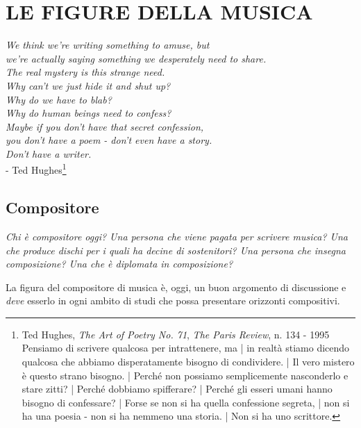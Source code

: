 
\chapter{LE FIGURE DELLA MUSICA}

\begin{flushright}
		\textit{We think we're writing something to amuse, but \\
            we're actually saying something we desperately need to share. \\
            The real mystery is this strange need. \\
            Why can't we just hide it and shut up? \\
            Why do we have to blab? \\
            Why do human beings need to confess? \\
            Maybe if you don't have that secret confession, \\
            you don't have a poem - don't even have a story. \\
            Don't have a writer.} \\
            - Ted Hughes\footnote{Ted Hughes, \emph{The Art of Poetry No. 71}, \emph{The Paris Review}, n. 134 - 1995\\
						Pensiamo di scrivere qualcosa per intrattenere, ma | in realtà stiamo
						dicendo qualcosa che abbiamo disperatamente bisogno di condividere. |
						Il vero mistero è questo strano bisogno. | Perché non possiamo
						semplicemente nasconderlo e stare zitti? | Perché dobbiamo spifferare? |
						Perché gli esseri umani hanno bisogno di confessare? | Forse se non
						si ha quella confessione segreta, |	non si ha una poesia - non si
						ha nemmeno una storia. | Non si ha uno scrittore.}
\end{flushright}

\section{Compositore}

\emph{Chi è compositore oggi? Una persona che viene pagata per scrivere musica?
Una che produce dischi per i quali ha decine di sostenitori? Una persona che
insegna composizione? Una che è diplomata in composizione?}

La figura del compositore di musica è, oggi, un buon argomento di discussione e
\emph{deve} esserlo in ogni ambito di studi che possa presentare orizzonti compositivi.

